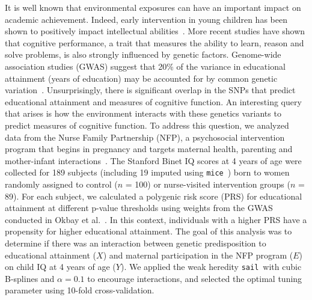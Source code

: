 \documentclass[useAMS,usenatbib,referee]{biom}
\newcommand{\sail}{\texttt{sail}}
\begin{document}
It is well known that environmental exposures can have an important impact on academic achievement.
Indeed, early intervention in young children has been shown to positively impact intellectual abilities~\citep{campbell1994effects}. 
More recent studies have shown that cognitive performance, a trait that measures the ability to learn, reason and solve problems, is also strongly influenced by genetic factors. Genome-wide association studies (GWAS) suggest that 20\% of the variance in educational attainment (years of education) may be accounted for by common genetic variation~\citep{rietveld2013gwas,okbay2016genome}. Unsurprisingly, there is significant overlap in the SNPs that predict educational attainment and measures of cognitive function. 
An interesting query that arises is how the environment interacts with these genetics variants to predict measures of cognitive function. 
To address this question, we analyzed data from the Nurse Family Partnership (NFP), a psychosocial intervention program that begins in pregnancy and targets maternal health, parenting and mother-infant interactions~\citep{olds1998long}. 
The Stanford Binet IQ scores at 4 years of age were collected for 189 subjects (including 19 imputed using \texttt{mice}~\citep{buuren2010mice}) born to women randomly assigned to control ($n$ = 100) or nurse-visited intervention groups ($n$ = 89). 
For each subject, we calculated a polygenic risk score (PRS) for educational attainment at different p-value thresholds using weights from the GWAS conducted in Okbay et al.~\citep{okbay2016genome}. 
In this context, individuals with a higher PRS have a propensity for higher educational attainment.  
The goal of this analysis was to determine if there was an interaction between genetic predisposition to educational attainment ($X$) and maternal participation in the NFP program ($E$) on child IQ at 4 years of age ($Y$). 
We applied the weak heredity \sail ~with cubic B-splines and $\alpha=0.1$ to encourage interactions, and selected the optimal tuning parameter using 10-fold cross-validation. 
\end{document}
